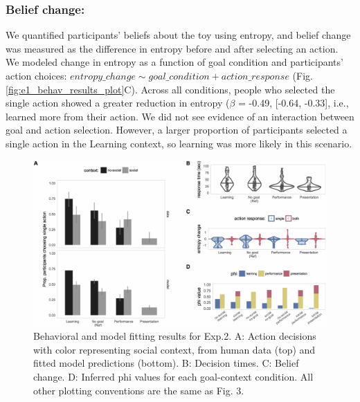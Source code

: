 \documentclass[10pt, letterpaper]{article}
\newenvironment{CodeChunk}{}{}
\begin{document}
\subsubsection{Belief change:}\label{belief-change}

We quantified participants' beliefs about the toy using entropy, and
belief change was measured as the difference in entropy before and after
selecting an action. We modeled change in entropy as a function of goal
condition and participants' action choices:
\texttt{$entropy\_change \sim goal\_condition + action\_response$} (Fig.
\ref{fig:e1_behav_results_plot}C). Across all conditions, people who
selected the single action showed a greater reduction in entropy
(\(\beta\) = -0.49, {[}-0.64, -0.33{]}, i.e., learned more from their
action. We did not see evidence of an interaction between goal and
action selection. However, a larger proportion of participants selected
a single action in the Learning context, so learning was more likely in
this scenario.

\begin{CodeChunk}
\begin{figure}[tb]

{\centering \includegraphics[width=0.95\linewidth]{figs/e2_results-1} 

}

\caption[Behavioral and model fitting results for Exp.2]{Behavioral and model fitting results for Exp.2. A: Action decisions with color representing social context, from human data (top) and fitted model predictions (bottom). B: Decision times. C: Belief change. D: Inferred phi values for each goal-context condition. All other plotting conventions are the same as Fig. 3.}\label{fig:e2_results}
\end{figure}
\end{CodeChunk}
\end{document}

